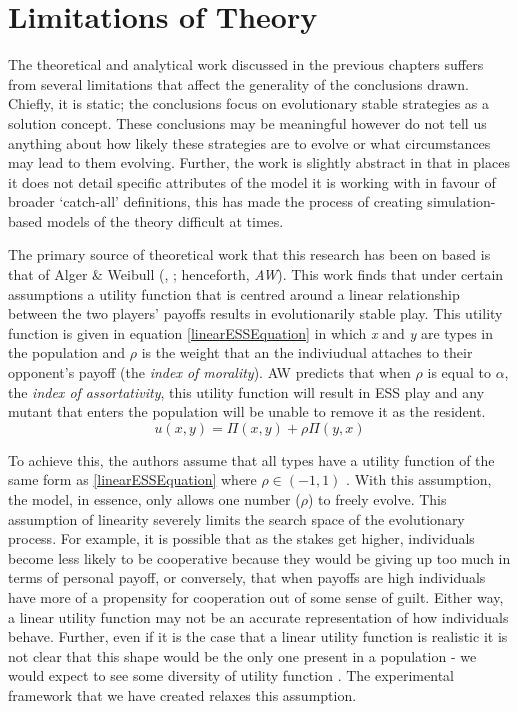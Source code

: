 \documentclass[11pt]{book}
\newcommand*{\np}{\par\noindent\newline}
\begin{document}
\section{Limitations of Theory}\label{limits_of_theory}
The theoretical and analytical work discussed in the previous chapters suffers from several limitations that affect the generality of the conclusions drawn. 
Chiefly, it is static; the conclusions focus on evolutionary stable strategies as a solution concept.
These conclusions may be meaningful however do not tell us anything about how likely these strategies are to evolve or what circumstances may lead to them evolving.
Further, the work is slightly abstract in that in places it does not detail specific attributes of the model it is working with in favour of broader `catch-all' definitions,
this has made the process of creating simulation-based models of the theory difficult at times.

\np The primary source of theoretical work that this research has been on based is that of Alger \& Weibull (\citeyear{alger_generalization_2012}, \citeyear{alger_homo_2013}; henceforth, \textit{AW}).
This work finds that under certain assumptions a utility function that is centred around a linear relationship between the two players' payoffs results in evolutionarily stable play.
This utility function is given in equation \ref{linearESSEquation} in which \textit{x} and \textit{y} are types in the population and $\rho$ is the weight that an the indiviudual attaches to their opponent's payoff (the \textit{index of morality}).
AW predicts that when $\rho$ is equal to $\alpha$, the \textit{index of assortativity}, this utility function will result in ESS play and any mutant that enters the population will be unable to remove it as the resident.
\begin{equation}
	\label{linearESSEquation}
	u(x, y) = \Pi(x,y) + \rho\Pi(y,x)
\end{equation}

\noindent To achieve this, the authors assume that all types have a utility function of the same form as \ref{linearESSEquation} where $\rho \in (-1, 1)$ \citep[p. ~47]{alger_generalization_2012}.
With this assumption, the model, in essence, only allows one number ($\rho$) to freely evolve.
This assumption of linearity severely limits the search space of the evolutionary process. 
For example, it is possible that as the stakes get higher, individuals become less likely to be cooperative because they would be giving up too much in terms of personal payoff, or conversely, that when payoffs are high individuals have more of a propensity for cooperation out of some sense of guilt.
Either way, a linear utility function may not be an accurate representation of how individuals behave.
Further, even if it is the case that a linear utility function is realistic it is not clear that this shape would be the only one present in a population - we would expect to see some diversity of utility function \citep{van_veelen_why_2006}.
The experimental framework that we have created relaxes this assumption.
\end{document}
